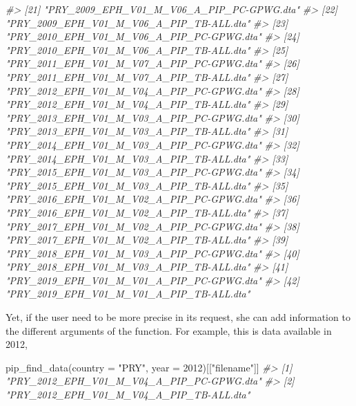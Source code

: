 \documentclass[
]{book}
\newenvironment{Shaded}{\begin{snugshade}}{\end{snugshade}}
\newcommand{\AttributeTok}[1]{\textcolor[rgb]{0.77,0.63,0.00}{#1}}
\newcommand{\CommentTok}[1]{\textcolor[rgb]{0.56,0.35,0.01}{\textit{#1}}}
\newcommand{\DecValTok}[1]{\textcolor[rgb]{0.00,0.00,0.81}{#1}}
\newcommand{\FunctionTok}[1]{\textcolor[rgb]{0.00,0.00,0.00}{#1}}
\newcommand{\NormalTok}[1]{#1}
\newcommand{\StringTok}[1]{\textcolor[rgb]{0.31,0.60,0.02}{#1}}
\begin{document}
\begin{Shaded}
\begin{Highlighting}[]
\CommentTok{\#\textgreater{} [21] "PRY\_2009\_EPH\_V01\_M\_V06\_A\_PIP\_PC{-}GPWG.dta"}
\CommentTok{\#\textgreater{} [22] "PRY\_2009\_EPH\_V01\_M\_V06\_A\_PIP\_TB{-}ALL.dta" }
\CommentTok{\#\textgreater{} [23] "PRY\_2010\_EPH\_V01\_M\_V06\_A\_PIP\_PC{-}GPWG.dta"}
\CommentTok{\#\textgreater{} [24] "PRY\_2010\_EPH\_V01\_M\_V06\_A\_PIP\_TB{-}ALL.dta" }
\CommentTok{\#\textgreater{} [25] "PRY\_2011\_EPH\_V01\_M\_V07\_A\_PIP\_PC{-}GPWG.dta"}
\CommentTok{\#\textgreater{} [26] "PRY\_2011\_EPH\_V01\_M\_V07\_A\_PIP\_TB{-}ALL.dta" }
\CommentTok{\#\textgreater{} [27] "PRY\_2012\_EPH\_V01\_M\_V04\_A\_PIP\_PC{-}GPWG.dta"}
\CommentTok{\#\textgreater{} [28] "PRY\_2012\_EPH\_V01\_M\_V04\_A\_PIP\_TB{-}ALL.dta" }
\CommentTok{\#\textgreater{} [29] "PRY\_2013\_EPH\_V01\_M\_V03\_A\_PIP\_PC{-}GPWG.dta"}
\CommentTok{\#\textgreater{} [30] "PRY\_2013\_EPH\_V01\_M\_V03\_A\_PIP\_TB{-}ALL.dta" }
\CommentTok{\#\textgreater{} [31] "PRY\_2014\_EPH\_V01\_M\_V03\_A\_PIP\_PC{-}GPWG.dta"}
\CommentTok{\#\textgreater{} [32] "PRY\_2014\_EPH\_V01\_M\_V03\_A\_PIP\_TB{-}ALL.dta" }
\CommentTok{\#\textgreater{} [33] "PRY\_2015\_EPH\_V01\_M\_V03\_A\_PIP\_PC{-}GPWG.dta"}
\CommentTok{\#\textgreater{} [34] "PRY\_2015\_EPH\_V01\_M\_V03\_A\_PIP\_TB{-}ALL.dta" }
\CommentTok{\#\textgreater{} [35] "PRY\_2016\_EPH\_V01\_M\_V02\_A\_PIP\_PC{-}GPWG.dta"}
\CommentTok{\#\textgreater{} [36] "PRY\_2016\_EPH\_V01\_M\_V02\_A\_PIP\_TB{-}ALL.dta" }
\CommentTok{\#\textgreater{} [37] "PRY\_2017\_EPH\_V01\_M\_V02\_A\_PIP\_PC{-}GPWG.dta"}
\CommentTok{\#\textgreater{} [38] "PRY\_2017\_EPH\_V01\_M\_V02\_A\_PIP\_TB{-}ALL.dta" }
\CommentTok{\#\textgreater{} [39] "PRY\_2018\_EPH\_V01\_M\_V03\_A\_PIP\_PC{-}GPWG.dta"}
\CommentTok{\#\textgreater{} [40] "PRY\_2018\_EPH\_V01\_M\_V03\_A\_PIP\_TB{-}ALL.dta" }
\CommentTok{\#\textgreater{} [41] "PRY\_2019\_EPH\_V01\_M\_V01\_A\_PIP\_PC{-}GPWG.dta"}
\CommentTok{\#\textgreater{} [42] "PRY\_2019\_EPH\_V01\_M\_V01\_A\_PIP\_TB{-}ALL.dta"}
\end{Highlighting}
\end{Shaded}

Yet, if the user need to be more precise in its request, she can add information to the different arguments of the function. For example, this is data available in 2012,

\begin{Shaded}
\begin{Highlighting}[]
\FunctionTok{pip\_find\_data}\NormalTok{(}\AttributeTok{country =} \StringTok{"PRY"}\NormalTok{, }
              \AttributeTok{year =} \DecValTok{2012}\NormalTok{)[[}\StringTok{"filename"}\NormalTok{]]}
\CommentTok{\#\textgreater{} [1] "PRY\_2012\_EPH\_V01\_M\_V04\_A\_PIP\_PC{-}GPWG.dta"}
\CommentTok{\#\textgreater{} [2] "PRY\_2012\_EPH\_V01\_M\_V04\_A\_PIP\_TB{-}ALL.dta"}
\end{Highlighting}
\end{Shaded}
\end{document}
